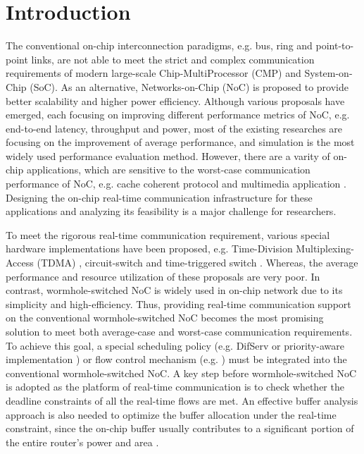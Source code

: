 \documentclass[preprint]{elsarticle}
\begin{document}
\linenumbers

\section{Introduction}
The conventional on-chip interconnection paradigms, e.g. bus, ring and point-to-point links, are not able to meet the strict and complex communication requirements of modern large-scale Chip-MultiProcessor (CMP) and System-on-Chip (SoC). As an alternative, Networks-on-Chip (NoC) is proposed to provide better scalability and higher power efficiency. Although various proposals have emerged, each focusing on improving different performance metrics of NoC, e.g. end-to-end latency, throughput and power, most of the existing researches are focusing on the improvement of average performance, and simulation is the most widely used performance evaluation method. However, there are a varity of on-chip applications, which are sensitive to the worst-case communication performance of NoC, e.g. cache coherent protocol \cite{Bolotin2007} and multimedia application \cite{ostermann2004video}. Designing the on-chip real-time communication infrastructure for these applications and analyzing its feasibility is a major challenge for researchers.

To meet the rigorous real-time communication requirement, various special hardware implementations have been proposed, e.g. Time-Division Multiplexing-Access (TDMA) \cite{GoDR05}, circuit-switch \cite{6628254} and time-triggered switch \cite{4617280}. Whereas, the average performance and resource utilization of these proposals are very poor. In contrast, wormhole-switched NoC is widely used in on-chip network due to its simplicity and high-efficiency. Thus, providing real-time communication support on the conventional wormhole-switched NoC becomes the most promising solution to meet both average-case and worst-case communication requirements. To achieve this goal, a special scheduling policy (e.g. DifServ \cite{1411140} or priority-aware implementation \cite{Shi:2008:RCA:1397757.1397996,708526,627905}) or flow control mechanism (e.g. \cite{Li199649,707545}) must be integrated into the conventional wormhole-switched NoC. A key step before wormhole-switched NoC is adopted as the platform of real-time communication is to check whether the deadline constraints of all the real-time flows are met. An effective buffer analysis approach is also needed to optimize the buffer allocation under the real-time constraint, since the on-chip buffer usually contributes to a significant portion of the entire router's power and area \cite{pkundu,5507566}.
\end{document}
